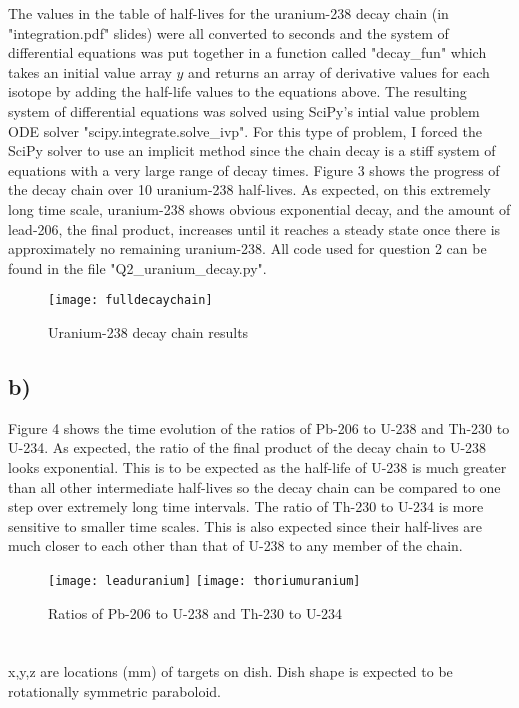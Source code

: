 \documentclass{article}
\newcommand{\<}[1]{\left\langle #1 \right\rangle }
\begin{document}
The values in the table of half-lives for the uranium-238 decay chain (in "integration.pdf" slides) were all converted to seconds and the system of differential equations was put together in a function called "decay\_fun" which takes an initial value array $y$ and returns an array of derivative values for each isotope by adding the half-life values to the equations above. The resulting system of differential equations was solved using SciPy's intial value problem ODE solver "scipy.integrate.solve\_ivp". For this type of problem, I forced the SciPy solver to use an implicit method since the chain decay is a stiff system of equations with a very large range of decay times. Figure 3 shows the progress of the decay chain over 10 uranium-238 half-lives. As expected, on this extremely long time scale, uranium-238 shows obvious exponential decay, and the amount of lead-206, the final product, increases until it reaches a steady state once there is approximately no remaining uranium-238. All code used for question 2 can be found in the file "Q2\_uranium\_decay.py".
\begin{figure}[h]
	\caption{Uranium-238 decay chain results}
	\centering
	\texttt{[image: fulldecaychain]}
\end{figure}

\subsection{b)}
Figure 4 shows the time evolution of the ratios of Pb-206 to U-238 and Th-230 to U-234. As expected, the ratio of the final product of the decay chain to U-238 looks exponential. This is to be expected as the half-life of U-238 is much greater than all other intermediate half-lives so the decay chain can be compared to one step over extremely long time intervals. The ratio of Th-230 to U-234 is more sensitive to smaller time scales. This is also expected since their half-lives are much closer to each other than that of U-238 to any member of the chain.
\begin{figure}[h]
	\caption{Ratios of Pb-206 to U-238 and Th-230 to U-234}
	\centering
	\texttt{[image: leaduranium]}
	\texttt{[image: thoriumuranium]}
\end{figure}

\section{}
x,y,z are locations (mm) of targets on dish. Dish shape is expected to be rotationally symmetric paraboloid. 
\end{document}

